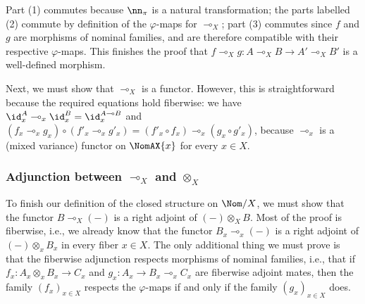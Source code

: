 \documentclass[twoside,11pt]{entics}
\begin{document}
Part (1) commutes because $\nn_{\pi}$ is a natural transformation; the
parts labelled (2) commute by definition of the $\varphi$-maps for
$\multimap_X$; part (3) commutes since $f$ and $g$ are morphisms of
nominal families, and are therefore compatible with their respective
$\varphi$-maps.  This finishes the proof that $f\multimap_X g:A\multimap_X
B\to A'\multimap_X B'$ is a well-defined morphism.

Next, we must show that $\multimap_X$ is a functor. However, this is
straightforward because the required equations hold fiberwise: we have
$\id^A_x \multimap_x \id^B_x = \id^{A \multimap B}_x$ and
$(f_x\multimap_x g_x)\circ (f'_x\multimap_x g'_x)=(f'_x\circ f_x)
\multimap_x (g_x\circ g'_x)$, because $\multimap_x$ is a (mixed
variance) functor on $\NomAX{x}$ for every $x\in X$.

\subsubsection{Adjunction between $\multimap_X$ and $\otimes_X$}

To finish our definition of the closed structure on $\Nom/X$, we must
show that the functor $B\multimap_X (-)$ is a right adjoint of
$(-)\otimes_X B$. Most of the proof is fiberwise, i.e., we already
know that the functor $B_x\multimap_x(-)$ is a right adjoint of
$(-)\otimes_x B_x$ in every fiber $x\in X$.  The only additional thing
we must prove is that the fiberwise adjunction respects morphisms of
nominal families, i.e., that if $f_x:A_x\otimes_x B_x\to C_x$ and
$g_x:A_x\to B_x\multimap_x C_x$ are fiberwise adjoint mates, then the
family $(f_x)_{x\in X}$ respects the $\varphi$-maps if and only if the
family $(g_x)_{x\in X}$ does.
\end{document}
